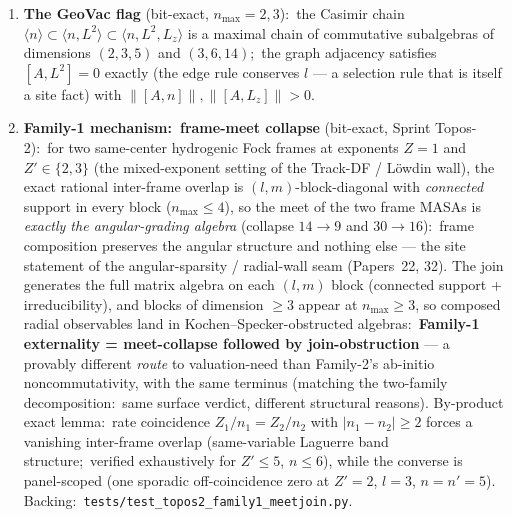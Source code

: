 \documentclass[11pt,a4paper]{article}
\theoremstyle{plain}
\theoremstyle{definition}
\begin{document}
\begin{enumerate}
    triples;\ containing the Conway--Kochen ray family) admits
    \emph{no} $0/1$ frame-function coloring (exhaustive search), while
    the range-$1$ set ($13$ rays) is colorable.  Hence dim-$\ge 3$
    blocks are valuation-\emph{obstructed} (their values are
    necessarily external data), dim-$2$ blocks are
    valuation-\emph{choiceable}, dim-$1$ blocks are pointed --- three
    site statuses matching forced / admitted / calibration structure
    at the block level.
  \item \textbf{The GeoVac flag} (bit-exact, $n_{\max} = 2, 3$):\ the
    Casimir chain $\langle n \rangle \subset \langle n, L^2 \rangle
    \subset \langle n, L^2, L_z \rangle$ is a maximal chain of
    commutative subalgebras of dimensions $(2, 3, 5)$ and
    $(3, 6, 14)$;\ the graph adjacency satisfies $[A, L^2] = 0$
    exactly (the edge rule conserves $l$ --- a selection rule that is
    itself a site fact) with $\|[A, n]\|, \|[A, L_z]\| > 0$.
  \item \textbf{Family-1 mechanism:\ frame-meet collapse} (bit-exact,
    Sprint Topos-2):\ for two same-center hydrogenic Fock frames at
    exponents $Z = 1$ and $Z' \in \{2, 3\}$ (the mixed-exponent
    setting of the Track-DF / L\"owdin wall), the exact rational
    inter-frame overlap is $(l, m)$-block-diagonal with
    \emph{connected} support in every block ($n_{\max} \le 4$), so the
    meet of the two frame MASAs is \emph{exactly the angular-grading
    algebra} (collapse $14 \to 9$ and $30 \to 16$):\ frame composition
    preserves the angular structure and nothing else --- the site
    statement of the angular-sparsity / radial-wall seam
    (Papers~22, 32).  The join generates the full matrix algebra on
    each $(l, m)$ block (connected support + irreducibility), and
    blocks of dimension $\ge 3$ appear at $n_{\max} \ge 3$, so
    composed radial observables land in Kochen--Specker-obstructed
    algebras:\ \textbf{Family-1 externality = meet-collapse followed
    by join-obstruction} --- a provably different \emph{route} to
    valuation-need than Family-2's ab-initio noncommutativity, with
    the same terminus (matching the two-family decomposition:\ same
    surface verdict, different structural reasons).  By-product exact
    lemma:\ rate coincidence $Z_1/n_1 = Z_2/n_2$ with
    $|n_1 - n_2| \ge 2$ forces a vanishing inter-frame overlap
    (same-variable Laguerre band structure;\ verified exhaustively for
    $Z' \le 5$, $n \le 6$), while the converse is panel-scoped (one
    sporadic off-coincidence zero at $Z' = 2$, $l = 3$, $n = n' = 5$).
    Backing:\ \texttt{tests/test\_topos2\_family1\_meetjoin.py}.

\end{enumerate}
\end{document}
